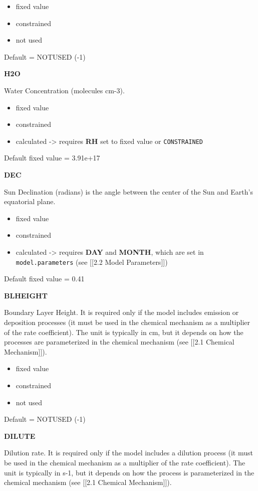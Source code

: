 \begin{itemize}
\item fixed value
\item constrained
\item not used
\end{itemize}

Default = NOTUSED (-1)

\textbf{H2O}

Water Concentration (molecules cm-3).

\begin{itemize}
\item fixed value
\item constrained
\item calculated -\textgreater{} requires \textbf{RH} set to fixed
value or \texttt{CONSTRAINED}
\end{itemize}

Default fixed value = 3.91e+17

\textbf{DEC}

Sun Declination (radians) is the angle between the center of the Sun
and Earth's equatorial plane.

\begin{itemize}
\item fixed value
\item constrained
\item calculated -\textgreater{} requires \textbf{DAY} and
\textbf{MONTH}, which are set in \texttt{model.parameters} (see
{[}{[}2.2 Model Parameters{]}{]})
\end{itemize}

Default fixed value = 0.41

\textbf{BLHEIGHT}

Boundary Layer Height. It is required only if the model includes
emission or deposition processes (it must be used in the chemical
mechanism as a multiplier of the rate coefficient). The unit is
typically in cm, but it depends on how the processes are parameterized
in the chemical mechanism (see {[}{[}2.1 Chemical Mechanism{]}{]}).

\begin{itemize}
\item fixed value
\item constrained
\item not used
\end{itemize}

Default = NOTUSED (-1)

\textbf{DILUTE}

Dilution rate. It is required only if the model includes a dilution
process (it must be used in the chemical mechanism as a multiplier of
the rate coefficient). The unit is typically in s-1, but it depends on
how the process is parameterized in the chemical mechanism (see
{[}{[}2.1 Chemical Mechanism{]}{]}).

